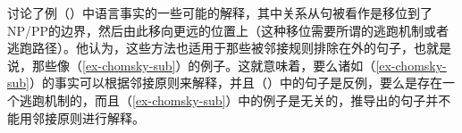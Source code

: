  \citet[--54]{Koster78b-u}讨论了例（）中语言事实的一些可能的解释，其中关系从句被看作是移位到了NP/PP的边界，然后由此移向更远的位置上（这种移位需要所谓的逃跑机制或者逃跑路径）。他认为，这些方法也适用于那些被邻接规则排除在外的句子，也就是说，那些像（\ref{ex-chomsky-sub}）的例子。这就意味着，要么诸如（\ref{ex-chomsky-sub}）的事实可以根据邻接原则来解释，并且（）中的句子是反例，要么是存在一个逃跑机制的，而且（\ref{ex-chomsky-sub}）中的例子是无关的，推导出的句子并不能用邻接原则进行解释。

